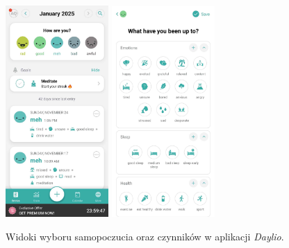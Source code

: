 \documentclass[inz, shortabstract]{iithesis}
\begin{document}
\begin{figure}[!ht]
\centering
\includegraphics[width=0.35\textwidth]{daylio1.jpg} 
\includegraphics[width=0.35\textwidth]{daylio2.jpg} 
\caption{Widoki wyboru samopoczucia oraz czynników w aplikacji \textit{Daylio}.}
\end{figure}
\end{document}

